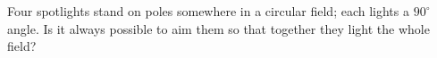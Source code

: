 Four spotlights stand on poles somewhere in a circular field; each lights a $90^\circ$ angle. Is it always possible to aim them so that together they light the whole field?
